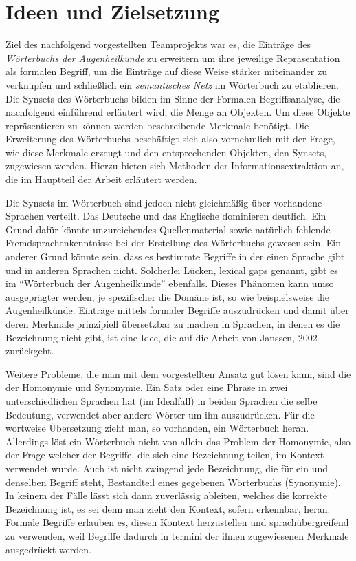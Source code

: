\documentclass[pagesize,DIV=calc,12pt,final]{scrreprt}
\begin{document}
\section{Ideen und Zielsetzung}

Ziel des nachfolgend vorgestellten Teamprojekts war es, die Einträge des \emph{Wörterbuchs der Augenheilkunde} zu erweitern um ihre jeweilige Repräsentation als formalen Begriff, um die Einträge auf diese Weise stärker miteinander zu verknüpfen und schließlich ein \emph{semantisches Netz} im Wörterbuch zu etablieren. 
Die Synsets des Wörterbuchs bilden im Sinne der Formalen Begriffsanalyse, die nachfolgend einführend erläutert wird, die Menge an Objekten. 
Um diese Objekte repräsentieren zu können werden beschreibende Merkmale benötigt. 
Die Erweiterung des Wörterbuchs beschäftigt sich also vornehmlich mit der Frage, wie diese Merkmale erzeugt und den entsprechenden Objekten, den Synsets, zugewiesen werden. 
Hierzu bieten sich Methoden der Informationsextraktion an, die im Hauptteil der Arbeit erläutert werden. 

Die Synsets im Wörterbuch sind jedoch nicht gleichmäßig über vorhandene Sprachen verteilt. 
Das Deutsche und das Englische dominieren deutlich. 
Ein Grund dafür könnte unzureichendes Quellenmaterial sowie natürlich fehlende Fremdsprachenkenntnisse bei der Erstellung des Wörterbuchs gewesen sein. 
Ein anderer Grund könnte sein, dass es bestimmte Begriffe in der einen Sprache gibt und in anderen Sprachen nicht. 
Solcherlei Lücken, lexical gaps genannt, gibt es im \enquote{Wörterbuch der Augenheilkunde} ebenfalls. 
Dieses Phänomen kann umso ausgeprägter werden, je spezifischer die Domäne ist, so wie beispielsweise die Augenheilkunde. 
Einträge mittels formaler Begriffe auszudrücken und damit über deren Merkmale prinzipiell übersetzbar zu machen in Sprachen, in denen es die Bezeichnung nicht gibt, ist eine Idee, die auf die Arbeit von Janssen, 2002 zurückgeht. 

Weitere Probleme, die man mit dem vorgestellten Ansatz gut lösen kann, sind die der Homonymie und Synonymie. 
Ein Satz oder eine Phrase in zwei unterschiedlichen Sprachen hat (im Idealfall) in beiden Sprachen die selbe Bedeutung, verwendet aber andere Wörter um ihn auszudrücken. 
Für die wortweise Übersetzung zieht man, so vorhanden, ein Wörterbuch heran. 
Allerdings löst ein Wörterbuch nicht von allein das Problem der Homonymie, also der Frage welcher der Begriffe, die sich eine Bezeichnung teilen, im Kontext verwendet wurde. 
Auch ist nicht zwingend jede Bezeichnung, die für ein und denselben Begriff steht, Bestandteil eines gegebenen Wörterbuchs (Synonymie). 
In keinem der Fälle lässt sich dann zuverlässig ableiten, welches die korrekte Bezeichnung ist, es sei denn man zieht den Kontext, sofern erkennbar, heran. 
Formale Begriffe erlauben es, diesen Kontext herzustellen und sprachübergreifend zu verwenden, weil Begriffe dadurch in termini der ihnen zugewiesenen Merkmale ausgedrückt werden. 
\end{document}
